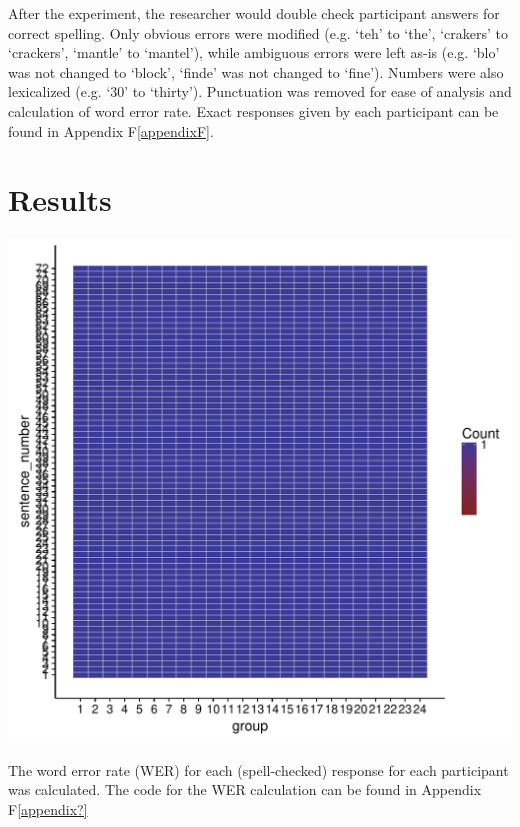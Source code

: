 \documentclass[dissertation,copyright]{uathesis}
\makeatletter
\def\maxwidth{ %
  \ifdim\Gin@nat@width>\linewidth
    \linewidth
  \else
    \Gin@nat@width
  \fi
}
\newenvironment{knitrout}{}{} %
\makeatother
\begin{document}
After the experiment, the researcher would double check participant answers for correct spelling.  Only obvious errors were modified (e.g. `teh' to `the', `crakers' to `crackers', `mantle' to `mantel'), while ambiguous errors were left as-is (e.g. `blo' was not changed to `block', `finde' was not changed to `fine').  Numbers were also lexicalized (e.g. `30' to `thirty').  Punctuation was removed for ease of analysis and calculation of word error rate.  Exact responses given by each participant can be found in Appendix F\ref{appendixF}.


\section{Results}
\label{ch4:results}

\begin{knitrout}
\color{fgcolor}
\includegraphics[width=\maxwidth]{figure/Exp_1_Data-1} 

\end{knitrout}

The word error rate (WER) for each (spell-checked) response for each participant was calculated. The code for the WER calculation can be found in Appendix F\ref{appendix?}
\end{document}
